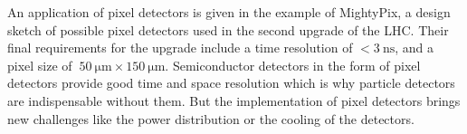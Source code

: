 An application of pixel detectors is given in the example of MightyPix, a design sketch of possible pixel detectors used in the second upgrade of the LHC.
Their final requirements for the upgrade include a time resolution of $<\SI{3}{\nano\second}$, and a pixel size of $~\SI{50}{\micro\meter}\times\SI{150}{\micro\meter}$. %
Semiconductor detectors in the form of pixel detectors provide good time and space resolution which is why particle detectors are indispensable without them.
But the implementation of pixel detectors brings new challenges like the power distribution or the cooling of the detectors.

